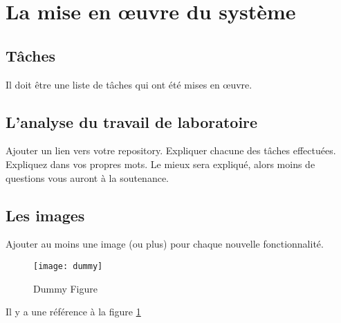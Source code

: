 \section{La mise en œuvre du système}

\subsection{Tâches}

Il doit être une liste de tâches qui ont été mises en œuvre.

\subsection{L'analyse du travail de laboratoire}

Ajouter un lien vers votre repository.
Expliquer chacune des tâches effectuées. Expliquez dans vos propres mots. Le mieux sera expliqué,
alors moins de questions vous auront à la soutenance.

\subsection{Les images}

Ajouter au moins une image (ou plus) pour chaque nouvelle fonctionnalité.
\begin{figure}[!ht]
\centering
\texttt{[image: dummy]}
\caption{Dummy Figure}\label{dummy}
\end{figure}

Il y a une référence à la figure \ref{dummy}

\clearpage
